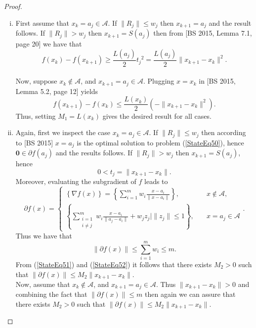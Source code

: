 \documentclass[11pt]{article}
\numberwithin{equation}{section}
\begin{document}
\begin{proof}
\begin{enumerate}[(i)]
	\item First assume that $x_k = a_j \in \mathcal{A}$. If $\|R_j\| \leq w_j$ then $x_{k+1} = a_j$ and the result follows. If $\|R_j\| > w_j$ then $x_{k+1} = S(a_j)$ then from [BS 2015, Lemma 7.1, page 20] we have that 
	\begin{equation*}
		f(x_k) - f(x_{k+1}) \geq \frac{L(a_j)}{2} {t_j}^2 = \frac{L(a_j)}{2} \|x_{k+1} - x_k\|^2.
	\end{equation*} \\
	Now, suppose $x_k \notin \mathcal{A}$, and $x_{k+1} = a_j \in \mathcal{A}$. Plugging $x=x_k$ in [BS 2015, Lemma 5.2, page 12] yields 
	\begin{equation*}
		f(x_{k+1}) - f(x_k) \leq \frac{L(x_k)}{2} \left( -\|x_{k+1} - x_k\|^2 \right).
	\end{equation*}
	Thus, setting $M_1 = L(x_k)$ gives the desired result for all cases.
	\item Again, first we inspect the case $x_k = a_j \in \mathcal{A}$. If $\|R_j\| \leq w_j$ then according to [BS 2015] $x=a_j$ is the optimal solution to problem (\ref{StateEq50}), hence $ \mathbf{0} \in \partial f(a_j)$ and the results follows. If $\|R_j\| > w_j$ then $x_{k+1} = S(a_j)$, hence 
	\begin{equation}
		0 < t_j = \|x_{k+1} - x_k\| . \label{StateEq51}
	\end{equation}
	Moreover, evaluating the subgradient of $f$ leads to
	\begin{equation*}
		\partial f(x) = \begin{cases} \left\lbrace \nabla f(x) \right\rbrace = \left\lbrace \sum\limits_{i=1}^{m} w_i \frac{x - a_i}{\|x - a_i\|} \right\rbrace, \quad &x \notin \mathcal{A}, \\ 
\left\lbrace \sum\limits_{\substack{i=1 \\ i \neq j}}^{m} w_i \frac{x - a_i}{\|a_j - a_i\|} + w_j z_j \mid \|z_j\| \leq 1 \right\rbrace, \quad &x=a_j \in \mathcal{A} \end{cases} .
	\end{equation*}
	Thus we have that
	\begin{equation}
		\| \partial f(x) \| \leq \sum\limits_{i=1}^{m} w_i \leq m .  \label{StateEq52}
	\end{equation}
	From (\ref{StateEq51}) and (\ref{StateEq52}) it follows that there exists $M_2 >0$ such that $\| \partial f(x) \| \leq M_2 \|x_{k+1} - x_k\|$. \\
	Now, assume that $x_k \notin \mathcal{A}$, and $x_{k+1} = a_j \in \mathcal{A}$. Thus $\|x_{k+1} - x_k\| > 0$ and combining the fact that $\| \partial f(x)\| \leq m$ then again we can assure that there exists $M_2 >0$ such that $\| \partial f(x) \| \leq M_2 \|x_{k+1} - x_k\|$. 
\end{enumerate}
\end{proof}
\end{document}
